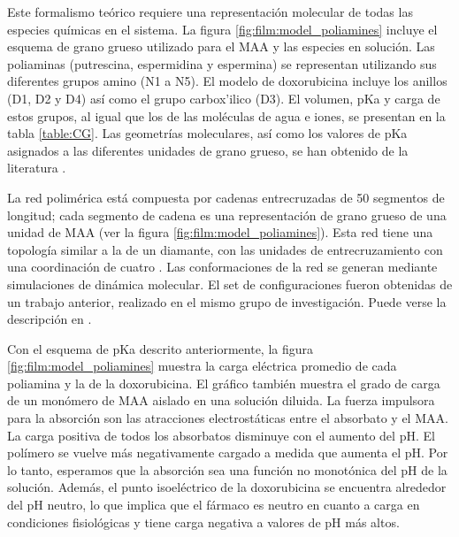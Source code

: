 Este formalismo te\'orico requiere una representaci\'on molecular de todas las especies qu\'imicas en el sistema. La figura \ref{fig:film:model_poliamines} incluye el esquema de grano grueso utilizado para el MAA y las especies en soluci\'on. Las poliaminas (putrescina, espermidina y espermina) se representan utilizando sus diferentes grupos amino (N1 a N5). El modelo de doxorubicina incluye los anillos (D1, D2 y D4) as\'i como el grupo carbox'ilico (D3). El volumen, pKa y carga de estos grupos, al igual que los de las mol\'eculas de agua e iones, se presentan en la tabla \ref{table:CG}. Las geometr\'ias moleculares, as\'i como los valores de pKa asignados a las diferentes unidades de grano grueso, se han obtenido de la literatura \cite{agostinelli2010polyamines,casero2009recent,puchem}.

La red polim\'erica est\'a compuesta por cadenas entrecruzadas de 50 segmentos de longitud; cada segmento de cadena es una representación de grano grueso de una unidad de MAA (ver la figura \ref{fig:film:model_poliamines}). Esta red tiene una topolog\'ia similar a la de un diamante, con las unidades de entrecruzamiento con una coordinaci\'on de cuatro  \cite{Mann2005,QuesadaPerez2012M,Kosovan2015,Hofzumahaus2018}. Las conformaciones de la red se generan mediante simulaciones de din\'amica molecular. El set de configuraciones fueron obtenidas de un trabajo anterior, realizado en el mismo grupo de investigaci\'on. Puede verse la descripci\'on en \cite{Hagemann2018}.



Con el esquema de pKa descrito anteriormente, la figura \ref{fig:film:model_poliamines} muestra la carga el\'ectrica promedio de cada poliamina y la de la doxorubicina. El gr\'afico tambi\'en muestra el grado de carga de un mon\'omero de MAA aislado en una soluci\'on diluida. La fuerza impulsora para la absorci\'on son las atracciones electrost\'aticas entre el absorbato y el MAA. La carga positiva de todos los absorbatos disminuye con el aumento del pH. El pol\'imero se vuelve m\'as negativamente cargado a medida que aumenta el pH. Por lo tanto, esperamos que la absorci\'on sea una funci\'on no monot\'onica del pH de la soluci\'on. Adem\'as, el punto isoel\'ectrico de la doxorubicina se encuentra alrededor del pH neutro, lo que implica que el f\'armaco es neutro en cuanto a carga en condiciones fisiol\'ogicas y tiene carga negativa a valores de pH m\'as altos.



